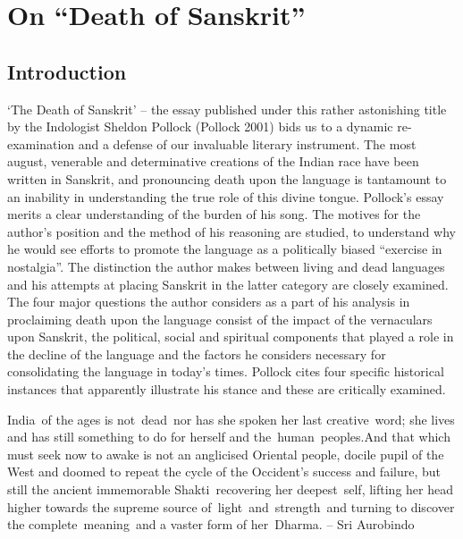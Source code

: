 \chapter{On “Death of Sanskrit”}\label{chapter8}


\section*{Introduction}

‘The Death of Sanskrit’ – the essay published under this rather astonishing title by the Indologist Sheldon Pollock (Pollock 2001) bids us to a dynamic re-examination and a defense of our invaluable literary instrument. The most august, venerable and determinative creations of the Indian race have been written in Sanskrit, and pronouncing death upon the language is tantamount to an inability in understanding the true role of this divine tongue. Pollock’s essay merits a clear understanding of the burden of his song. The motives for the author’s position and the method of his reasoning are studied, to understand why he would see efforts to promote the language as a politically biased “exercise in nostalgia”. The distinction the author makes between living and dead languages and his attempts at placing Sanskrit in the latter category are closely examined.  The four major questions the author considers as a part of his analysis in proclaiming death upon the language consist of the impact of the vernaculars upon Sanskrit, the political, social and spiritual components that played a role in the decline of the language and the factors he considers necessary for consolidating the language in today’s times. Pollock cites four specific historical instances that apparently illustrate his stance and these are critically examined.
\newpage

\begin{myquote}
India of the ages is not dead nor has she spoken her last creative word; she lives and has still something to do for herself and the human peoples.\break And that which must seek now to awake is not an anglicised Oriental people, docile pupil of the West and doomed to repeat the cycle of the Occident's success and failure, but still the ancient immemorable  Shakti recovering her deepest self, lifting her head higher towards the supreme source of light and strength and turning to discover the complete meaning and a vaster form of her Dharma. \hfill– Sri Aurobindo
\end{myquote} 

